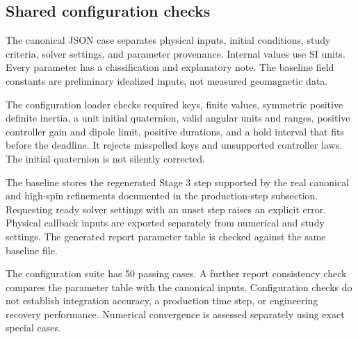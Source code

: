 \subsection{Shared configuration checks}
The canonical JSON case separates physical inputs, initial conditions, study criteria, solver settings, and parameter provenance. Internal values use SI units. Every parameter has a classification and explanatory note. The baseline field constants are preliminary idealized inputs, not measured geomagnetic data.

The configuration loader checks required keys, finite values, symmetric positive definite inertia, a unit initial quaternion, valid angular units and ranges, positive controller gain and dipole limit, positive durations, and a hold interval that fits before the deadline. It rejects misspelled keys and unsupported controller laws. The initial quaternion is not silently corrected.

The baseline stores the regenerated Stage 3 step supported by the real canonical and high-spin refinements documented in the production-step subsection. Requesting ready solver settings with an unset step raises an explicit error. Physical callback inputs are exported separately from numerical and study settings. The generated report parameter table is checked against the same baseline file.

The configuration suite has 50 passing cases. A further report consistency check compares the parameter table with the canonical inputs. Configuration checks do not establish integration accuracy, a production time step, or engineering recovery performance. Numerical convergence is assessed separately using exact special cases.
